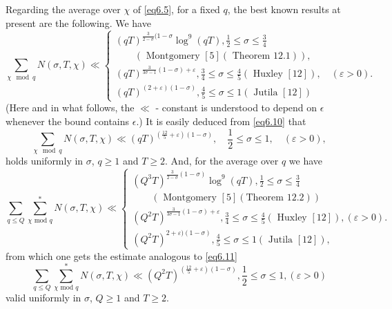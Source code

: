 Regarding the average over $\chi$ of \eqref{eq6.5}, for a fixed $q$, the
best known results at present are the following. We have 
{\fontsize{10pt}{12pt}\selectfont
\begin{equation*}
\sum_{\chi \mod q} N(\sigma ,T,\chi ) \ll 
\begin{cases}
(qT)^{\frac{3}{2-\sigma}(1-\sigma} \log^9 (qT), \frac{1}{2} \leq
  \sigma \leq \frac{3}{4}\\
\qquad (\text{ Montgomery } [5] (\text{ Theorem
  }12.1)),\\ 
(qT)^{\frac{3}{3\sigma -1}(1-\sigma ) + \varepsilon},\frac{3}{4}\leq
  \sigma \leq \frac{4}{5}(\text{ Huxley } [12]),\quad (\varepsilon >
  0).\\ 
(qT)^{(2+\varepsilon )(1-\sigma)},\frac{4}{5} \leq \sigma \leq 1
  (\text{ Jutila } [12]) 
\end{cases} \tag{6.10}\label{eq6.10}
\end{equation*}}\relax\pageoriginale
(Here and in what follows, the $\ll$ - constant is understood to
depend on $\epsilon$ whenever the bound contains $\epsilon$.) It
is easily deduced from \eqref{eq6.10} that 
\begin{equation*}
\sum_{\chi \mod q} N(\sigma , T,\chi ) \ll
(qT)^{(\frac{12}{5}+\varepsilon)(1-\sigma)},\quad \frac{1}{2}\leq \sigma
\leq 1,\quad (\varepsilon > 0), \tag{6.11}\label{eq6.11} 
\end{equation*}
holds uniformly in $\sigma$, $q\geq 1$ and $T \geq 2$. And, for the
average over $q$ we have 
{\fontsize{9pt}{11pt}\selectfont
\begin{equation*}
\sum_{q \leq Q}\sum_{\chi \text{ mod }q}^* N(\sigma ,T,\chi ) \ll 
\begin{cases}
(Q^3T)^{\frac{3}{2-\sigma}(1-\sigma )}\log^9(qT),\frac{1}{2}\leq
  \sigma \leq \frac{3}{4}\\
\qquad (\text{ Montgomery }[5] (\text{Theorem $12.2$}))\\
(Q^2T)^{\frac{3}{3\sigma-1}(1-\sigma)+\varepsilon},\frac{3}{4}\leq \sigma \leq \frac{4}{5}(\text{ Huxley }[12]),(\varepsilon > 0).\\
(Q^2T)^{2+\varepsilon)(1-\sigma)},\frac{4}{5}\leq \sigma \leq 1 (\text{ Jutila }[12]),
\end{cases} \tag{6.12}\label{eq6.12}
\end{equation*}}\relax
from which one gets the estimate analogous to \eqref{eq6.11}
\begin{equation*}
\sum_{q \leq Q}\sum_{\chi \text{ mod }q}^* N(\sigma ,T,\chi) \ll
(Q^2T)^{(\frac{12}{5} + \varepsilon )(1-\sigma )}, \frac{1}{2} \leq
\sigma \leq 1, (\varepsilon > 0) \tag{6.13}\label{eq6.13} 
\end{equation*}
valid uniformly in $\sigma$, $Q\geq 1$ and $T \geq 2$.


